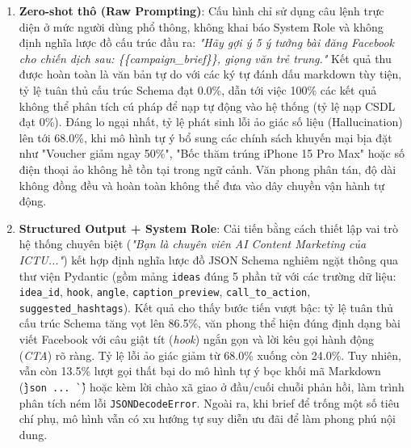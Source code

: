 \begin{enumerate}[label=\textbf{Vòng \arabic*:},leftmargin=1.8cm]
\item \textbf{Zero-shot thô (Raw Prompting)}: Cấu hình chỉ sử dụng câu lệnh trực diện ở mức người dùng phổ thông, không khai báo System Role và không định nghĩa lược đồ cấu trúc đầu ra: \textit{"Hãy gợi ý 5 ý tưởng bài đăng Facebook cho chiến dịch sau: \{\{campaign\_brief\}\}, giọng văn trẻ trung."}
Kết quả thu được hoàn toàn là văn bản tự do với các ký tự đánh dấu markdown tùy tiện, tỷ lệ tuân thủ cấu trúc Schema đạt 0.0\%, dẫn tới việc 100\% các kết quả không thể phân tích cú pháp để nạp tự động vào hệ thống (tỷ lệ nạp CSDL đạt 0\%). Đáng lo ngại nhất, tỷ lệ phát sinh lỗi ảo giác số liệu (Hallucination) lên tới 68.0\%, khi mô hình tự ý bổ sung các chính sách khuyến mại bịa đặt như "Voucher giảm ngay 50\%", "Bốc thăm trúng iPhone 15 Pro Max" hoặc số điện thoại ảo không hề tồn tại trong ngữ cảnh. Văn phong phân tán, độ dài không đồng đều và hoàn toàn không thể đưa vào dây chuyền vận hành tự động.

\item \textbf{Structured Output + System Role}: Cải tiến bằng cách thiết lập vai trò hệ thống chuyên biệt (\textit{"Bạn là chuyên viên AI Content Marketing của ICTU..."}) kết hợp định nghĩa lược đồ JSON Schema nghiêm ngặt thông qua thư viện Pydantic (gồm mảng \texttt{ideas} đúng 5 phần tử với các trường dữ liệu: \texttt{idea\_id}, \texttt{hook}, \texttt{angle}, \texttt{caption\_preview}, \texttt{call\_to\_action}, \texttt{suggested\_hashtags}).
Kết quả cho thấy bước tiến vượt bậc: tỷ lệ tuân thủ cấu trúc Schema tăng vọt lên 86.5\%, văn phong thể hiện đúng định dạng bài viết Facebook với câu giật tít (\textit{hook}) ngắn gọn và lời kêu gọi hành động (\textit{CTA}) rõ ràng. Tỷ lệ lỗi ảo giác giảm từ 68.0\% xuống còn 24.0\%. Tuy nhiên, vẫn còn 13.5\% lượt gọi thất bại do mô hình tự ý bọc khối mã Markdown (\texttt{\`\`\`json ... \`\`\`}) hoặc kèm lời chào xã giao ở đầu/cuối chuỗi phản hồi, làm trình phân tích ném lỗi \texttt{JSONDecodeError}. Ngoài ra, khi brief để trống một số tiêu chí phụ, mô hình vẫn có xu hướng tự suy diễn ưu đãi để làm phong phú nội dung.


\end{enumerate}
